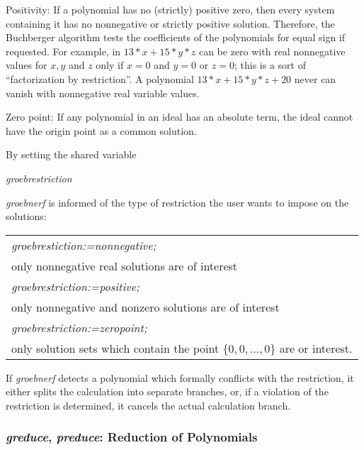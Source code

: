 Positivity: If a polynomial has no (strictly) positive zero, then
every system containing it has no nonnegative or strictly positive
solution. Therefore, the Buchberger algorithm tests the coefficients of
the polynomials for equal sign if requested. For example, in $13*x +
15*y*z $ can be zero with real nonnegative values for $x, y$ and $z$
only if $x=0$ and $y=0$ or $ z=0$; this is a sort of ``factorization by
restriction''. A polynomial $13*x + 15*y*z + 20$ never can vanish
with nonnegative real variable values.

Zero point:  If any polynomial in an ideal has an absolute term, the ideal
cannot have the origin point as a common solution.

By setting the shared variable
\begin{center} \emph{groebrestriction} \end{center}
\emph{groebnerf} is informed of the type of restriction the user wants to
impose on the solutions:
\begin{center}
\begin{tabular}{l}
{\it groebrestiction:=nonnegative;} \\
\hspace*{+.5cm} only nonnegative real solutions are of
interest\vspace*{4mm} \\
{\it groebrestriction:=positive;} \\
\hspace*{+.5cm}only nonnegative and nonzero solutions are of
interest\vspace*{4mm} \\
{\it groebrestriction:=zeropoint;} \\
\hspace*{+.5cm}only solution sets which contain the point
$\{0,0,\ldots,0\}$ are or interest.
\end{tabular}
\end{center}

If \emph{groebnerf} detects a polynomial which formally conflicts with the
restriction, it either splits the calculation into separate branches, or,
if a violation of the restriction is determined, it cancels the actual
calculation branch.

\subsubsection{\emph{greduce}, \emph{preduce}: Reduction of Polynomials}

